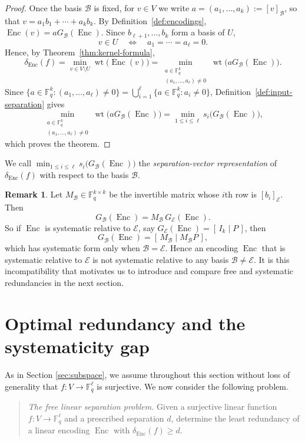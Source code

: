 \documentclass[a4paper,12pt]{article}
\theoremstyle{plain}
\theoremstyle{definition}
\newtheorem{remark}[lemma]{Remark}
\newcommand{\F}{\mathbb F}
\newcommand{\wt}{\operatorname{wt}}
\newcommand{\Enc}{\operatorname{Enc}}
\begin{document}
\begin{proof}
Once the basis $\mathcal{B}$ is fixed, for $v\in V$ we write $a=(a_1,\dots,a_k):=[v]_{\mathcal B}$, so that
$v=a_1b_1+\cdots+a_kb_k$.
By Definition~\ref{def:encodings},
$\Enc(v)=aG_{\mathcal B}(\Enc)$.
Since $b_{\ell+1},\dots,b_k$ form a
basis of $U$,
\[
v\in U
\quad\Longleftrightarrow\quad
a_1=\cdots=a_\ell=0.
\]
Hence, by Theorem~\ref{thm:kernel-formula},
\[
\delta_{\Enc}(f)
=
\min_{v\in V\setminus U}\wt\bigl(\Enc(v)\bigr)
=
\min_{\substack{a\in\F_q^k\\(a_1,\dots,a_\ell)\neq0}}
\wt\bigl(aG_{\mathcal B}(\Enc)\bigr).
\]
Since
$\{a\in\F_q^k:(a_1,\dots,a_\ell)\neq0\}
=\bigcup_{i=1}^\ell\{a\in\F_q^k:a_i\neq0\}$, Definition~\ref{def:input-separation} gives
\[
\min_{\substack{a\in\F_q^k\\(a_1,\dots,a_\ell)\neq0}}
\wt\bigl(aG_{\mathcal B}(\Enc)\bigr)
=
\min_{1\leq i\leq \ell}s_i\bigl(G_{\mathcal B}(\Enc)\bigr),
\]
which proves the theorem.
\end{proof}
We call   $\min_{1\leq i\leq \ell}s_i\bigl(G_{\mathcal B}(\Enc)\bigr)$   the \emph{separation-vector
representation} of $\delta_{\Enc}(f)$ with respect to the basis $\mathcal B$.

\begin{remark} 
\label{rem:basis-change-systematicity}
Let $M_{\mathcal B}\in\F_q^{k\times k}$ be the invertible matrix
whose $i$th row is $[b_i]_{\mathcal E}$. Then
\[
G_{\mathcal B}(\Enc)=M_{\mathcal B}\,G_{\mathcal E}(\Enc).
\]
So if $\Enc$ is systematic relative to $\mathcal E$, say
$G_{\mathcal E}(\Enc)=[\,I_k\mid P\,]$, then
\[
G_{\mathcal B}(\Enc)=[\,M_{\mathcal B}\mid M_{\mathcal B}P\,],
\]
which has systematic form only when $\mathcal B=\mathcal E$. 
Hence an encoding $\Enc$ that is systematic relative to $\mathcal E$ is not systematic relative
to any basis $\mathcal B\neq\mathcal E$. 
It is this incompatibility  that motivates us to introduce and compare free and systematic redundancies in the next section. 
\end{remark}

\section{Optimal redundancy and the systematicity gap}
\label{sec:systematicity}
As in Section \ref{sec:subspace}, we assume throughout this section without loss
of generality that  $f\colon V\to\F_q^\ell$ is surjective.
We now consider the following problem.

\begin{quote}
\emph{The free linear separation problem.}
Given a surjective linear function $f\colon V\to\F_q^\ell$ and a
prescribed separation $d$, determine the least redundancy of a
linear encoding $\Enc$ with $\delta_{\Enc}(f)\geq d$.
\end{quote}
\end{document}
